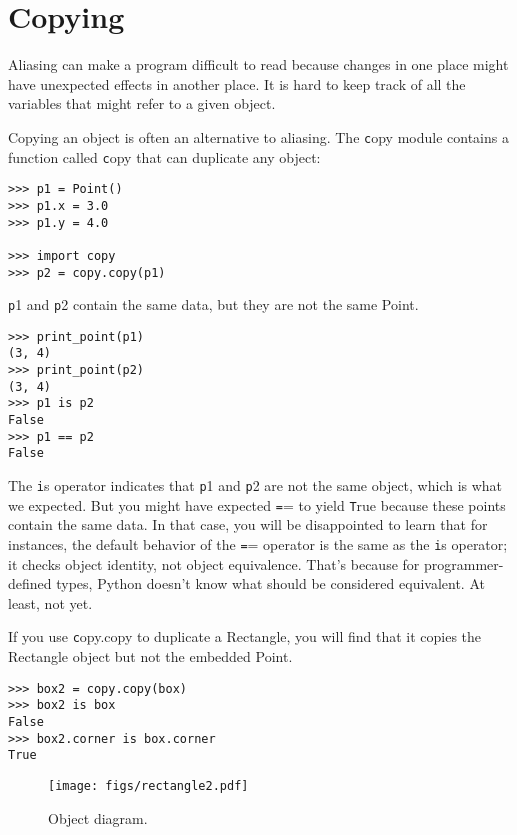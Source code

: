 \documentclass[
DIV=11,
fontsize=13,
twoside,
headinclude=false,
titlepage=firstiscover,
abstract=true,
headsepline=true,
footsepline=true,
chapterprefix=true, %
headings=big,
bibliography=totoc,%
captions=tableheading
]{scrbook}
\theoremstyle{definition}
\begin{document}
\section{Copying}
\label{copying}

Aliasing can make a program difficult to read because changes
in one place might have unexpected effects in another place.
It is hard to keep track of all the variables that might refer
to a given object.

Copying an object is often an alternative to aliasing.
The {\texttt copy} module contains a function called {\texttt copy} that
can duplicate any object:

\begin{lstlisting}
>>> p1 = Point()
>>> p1.x = 3.0
>>> p1.y = 4.0

>>> import copy
>>> p2 = copy.copy(p1)
\end{lstlisting}
%
{\texttt p1} and {\texttt p2} contain the same data, but they are
not the same Point.

\begin{lstlisting}
>>> print_point(p1)
(3, 4)
>>> print_point(p2)
(3, 4)
>>> p1 is p2
False
>>> p1 == p2
False
\end{lstlisting}
%
The {\texttt is} operator indicates that {\texttt p1} and {\texttt p2} are not the
same object, which is what we expected.  But you might have expected
{\texttt ==} to yield {\texttt True} because these points contain the same
data.  In that case, you will be disappointed to learn that for
instances, the default behavior of the {\texttt ==} operator is the same
as the {\texttt is} operator; it checks object identity, not object
equivalence.  That's because for programmer-defined types, Python doesn't
know what should be considered equivalent.  At least, not yet.

If you use {\texttt copy.copy} to duplicate a Rectangle, you will find
that it copies the Rectangle object but not the embedded Point.

\begin{lstlisting}
>>> box2 = copy.copy(box)
>>> box2 is box
False
>>> box2.corner is box.corner
True
\end{lstlisting}

\begin{figure}
\centerline
{\texttt{[image: figs/rectangle2.pdf]}}
\caption{Object diagram.}
\label{fig.rectangle2}
\end{figure}
\end{document}
